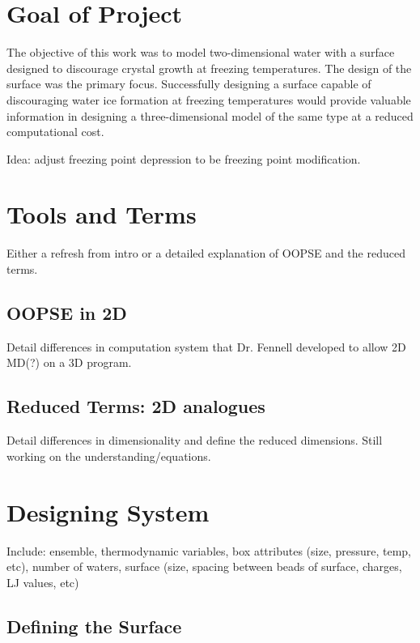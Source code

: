 \section{Goal of Project}

The objective of this work was to model two-dimensional water with a surface designed to discourage crystal growth at freezing temperatures. 
The design of the surface was the primary focus. 
Successfully designing a surface capable of discouraging water ice formation at freezing temperatures would provide valuable information in designing a three-dimensional model of the same type at a reduced computational cost. 

Idea: adjust freezing point depression to be freezing point modification.

\section{Tools and Terms}

Either a refresh from intro or a detailed explanation of OOPSE and the reduced terms.

\subsection{OOPSE in 2D}

Detail differences in computation system that Dr. Fennell developed to allow 2D MD(?) on a 3D program.

\subsection{Reduced Terms: 2D analogues}

Detail differences in dimensionality and define the reduced dimensions. Still working on the understanding/equations.

\section{Designing System}

Include: 
ensemble, 
thermodynamic variables, 
box attributes (size, pressure, temp, etc), 
number of waters,
surface (size, spacing between beads of surface, charges, LJ values, etc)

\subsection{Defining the Surface}

